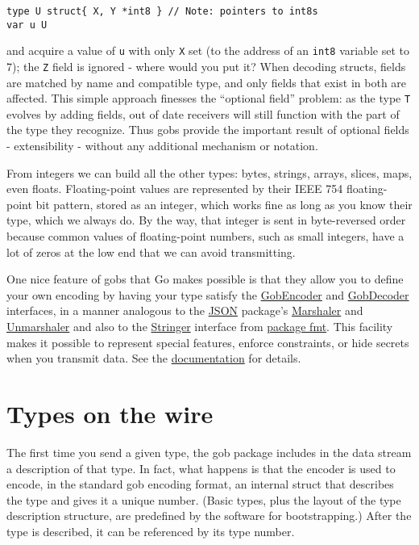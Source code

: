 \begin{Verbatim}[frame=single]
type U struct{ X, Y *int8 } // Note: pointers to int8s
var u U
\end{Verbatim}

and acquire a value of \texttt{u} with only \texttt{X} set (to the
address of an \texttt{int8} variable set to 7); the \texttt{Z} field is
ignored - where would you put it? When decoding structs, fields are
matched by name and compatible type, and only fields that exist in both
are affected. This simple approach finesses the ``optional field''
problem: as the type \texttt{T} evolves by adding fields, out of date
receivers will still function with the part of the type they recognize.
Thus gobs provide the important result of optional fields -
extensibility - without any additional mechanism or notation.

From integers we can build all the other types: bytes, strings, arrays,
slices, maps, even floats. Floating-point values are represented by
their IEEE 754 floating-point bit pattern, stored as an integer, which
works fine as long as you know their type, which we always do. By the
way, that integer is sent in byte-reversed order because common values
of floating-point numbers, such as small integers, have a lot of zeros
at the low end that we can avoid transmitting.

One nice feature of gobs that Go makes possible is that they allow you
to define your own encoding by having your type satisfy the
\href{http://golang.org/pkg/encoding/gob/\#GobEncoder}{GobEncoder} and
\href{http://golang.org/pkg/encoding/gob/\#GobDecoder}{GobDecoder} interfaces, in a
manner analogous to the \href{http://golang.org/pkg/encoding/json/}{JSON} package's
\href{http://golang.org/pkg/encoding/json/\#Marshaler}{Marshaler} and
\href{http://golang.org/pkg/encoding/json/\#Unmarshaler}{Unmarshaler} and also to the
\href{http://golang.org/pkg/fmt/\#Stringer}{Stringer} interface from
\href{http://golang.org/pkg/fmt/}{package fmt}. This facility makes it possible to
represent special features, enforce constraints, or hide secrets when
you transmit data. See the \href{http://golang.org/pkg/encoding/gob/}{documentation} for
details.

\section*{Types on the wire}

The first time you send a given type, the gob package includes in the
data stream a description of that type. In fact, what happens is that
the encoder is used to encode, in the standard gob encoding format, an
internal struct that describes the type and gives it a unique number.
(Basic types, plus the layout of the type description structure, are
predefined by the software for bootstrapping.) After the type is
described, it can be referenced by its type number.

